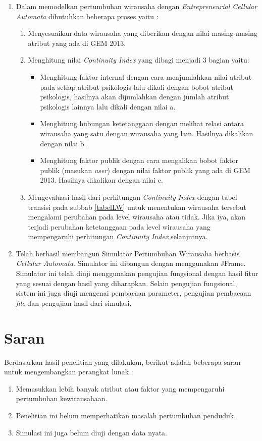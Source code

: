 \begin{enumerate}
	\item Dalam memodelkan pertumbuhan wirausaha dengan \textit{Entrepreneurial Cellular Automata} dibutuhkan beberapa proses yaitu :\\
	\begin{enumerate}
		\item Menyesuaikan data wirausaha yang diberikan dengan nilai masing-masing atribut yang ada di GEM 2013.
		\item Menghitung nilai \textit{Continuity Index} yang dibagi menjadi 3 bagian yaitu:
		\begin{itemize}
			\item Menghitung faktor internal dengan cara menjumlahkan nilai atribut pada setiap atribut psikologis lalu dikali dengan bobot atribut psikologis, hasilnya akan dijumlahkan dengan jumlah atribut psikologis lainnya lalu dikali dengan nilai a.
			\item Menghitung hubungan ketetanggaan dengan melihat relasi antara wirausaha yang satu dengan wirausaha yang lain. Hasilnya dikalikan dengan nilai b.
			\item Menghitung faktor publik dengan cara mengalikan bobot faktor publik (masukan \textit{user}) dengan nilai faktor publik yang ada di GEM 2013. Hasilnya dikalikan dengan nilai c.
		\end{itemize}
		\item Mengevaluasi hasil dari perhitungan \textit{Continuity Index} dengan tabel transisi pada subbab \ref{tabelLW} untuk menentukan wirausaha tersebut mengalami perubahan pada level wirausaha atau tidak. Jika iya, akan terjadi perubahan ketetanggaan pada level wirausaha yang mempengaruhi perhitungan \textit{Continuity Index} selanjutnya.
	\end{enumerate}
	\item Telah berhasil membangun Simulator Pertumbuhan Wirausaha berbasis \textit{Cellular Automata}. Simulator ini dibangun dengan menggunakan JFrame. Simulator ini telah diuji menggunakan pengujian fungsional dengan hasil fitur yang sesuai dengan hasil yang diharapkan. Selain pengujian fungsional, sistem ini juga diuji mengenai pembacaan parameter, pengujian pembacaan \textit{file} dan pengujian hasil dari simulasi.
\end{enumerate}

\section{Saran}
Berdasarkan hasil penelitian yang dilakukan, berikut adalah beberapa saran untuk mengembangkan perangkat lunak :
\begin{enumerate}
	\item Memasukkan lebih banyak atribut atau faktor yang mempengaruhi pertumbuhan kewirausahaan.
	\item Penelitian ini belum memperhatikan masalah pertumbuhan penduduk.
	\item Simulasi ini juga belum diuji dengan data nyata.
\end{enumerate}